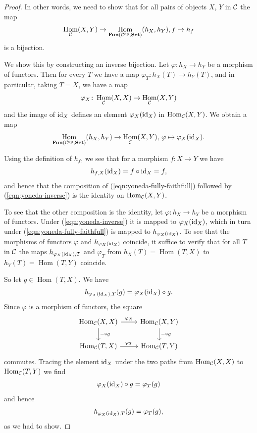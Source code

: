 \documentclass[11pt]{amsbook}
\DeclareMathOperator\Hom{Hom}
\def\id{{\rm id}}
\def\opp{\mathrm{op}}
\def\Set{\mathbf{Set}}
\def\Fun{\mathbf{Fun}}
\theoremstyle{plain}
\theoremstyle{definition}
\begin{document}
\begin{proof}
In other words, we need to show that for all pairs of objects $X$, $Y$ in ${\mathcal{C}}$ the map
\begin{equation}\label{eqn:yoneda-fully-faithfull}
	\Hom_\cC(X,Y) \to \Hom_{\Fun(\cC^\opp,\Set)}(h_X,h_Y), f \mapsto h_f
\end{equation}
is a bijection. 

We show this by constructing an inverse bijection. Let $\varphi\colon h_X\to h_Y$ be a morphism of functors. Then for every $T$ we have a map $\varphi_T\colon h_X(T) \to h_Y(T)$, and in particular, taking $T=X$, we have a map
\[
	\varphi_X \colon \Hom_\cC(X,X) \to \Hom_\cC(X,Y)
\]
and the image of $\id_X$ defines an element $\varphi_X(\id_X)$ in $\Hom_\cC(X,Y)$. We obtain a map
\begin{equation}\label{eqn:yoneda-inverse}
	\Hom_{\Fun(\cC^\opp,\Set)}(h_X,h_Y) \to \Hom_\cC(X,Y),\, \varphi \mapsto \varphi_X(\id_X).
\end{equation}

Using the definition of $h_f$, we see that for a morphism $f\colon X\to Y$ we have
\[
	h_{f,X}(\id_X) = f \circ \id_X = f,
\]
and hence that the composition of (\ref{eqn:yoneda-fully-faithfull}) followed by (\ref{eqn:yoneda-inverse}) is the
identity on $\Hom_\cC(X,Y)$.

To see that the other composition is the identity, let $\varphi\colon h_X\to h_Y$ be a morphism of functors. Under (\ref{eqn:yoneda-inverse})
it is mapped to $\varphi_X(\id_X)$, which in turn under (\ref{eqn:yoneda-fully-faithfull}) is mapped to $h_{\varphi_X(\id_X)}$. To see that the morphisms of functors $\varphi$ and $h_{\varphi_X(\id_X)}$ coincide, it suffice to verify that for all $T$ in ${\mathcal{C}}$ 
the maps $h_{\varphi_X(\id_X),T}$ and $\varphi_T$ from $h_X(T)=\Hom(T,X)$ to $h_Y(T)=\Hom(T,Y)$ coincide.

So let $g\in \Hom(T,X)$. We have
\[
	h_{\varphi_X(\id_X),T}(g) = \varphi_X(\id_X) \circ g. 
\]
Since $\varphi$ is a morphism of functors, the square
\[
\begin{tikzcd}
\Hom_\cC(X,X) \arrow{r}{\varphi_X} \arrow{d}{-\circ g} & \Hom_\cC(X,Y) \arrow{d}{-\circ g} \\
\Hom_\cC(T,X) \arrow{r}{\varphi_T} & \Hom_\cC(T,Y)
\end{tikzcd}
\]
commutes. Tracing the element $\id_X$ under the two paths from $\Hom_\cC(X,X)$ to $\Hom_\cC(T,Y)$ we find
\[
	\varphi_X(\id_X) \circ g = \varphi_T(g)
\]
and hence
\[
	h_{\varphi_X(\id_X),T}(g) = \varphi_T(g),
\]
as we had to show.
\end{proof}
\end{document}
